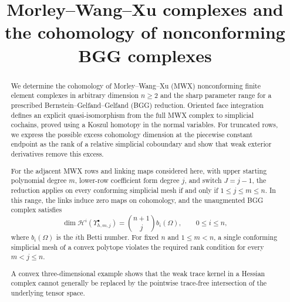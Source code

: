 \documentclass[10pt]{amsart}
\numberwithin{equation}{section}
\begin{document}
\title[MWX and nonconforming BGG cohomology]{Morley--Wang--Xu complexes and the cohomology of nonconforming BGG complexes}



\begin{abstract}
We determine the cohomology of Morley--Wang--Xu (MWX) nonconforming finite
element complexes in arbitrary dimension $n\geq2$ and the sharp parameter
range for a prescribed Bernstein--Gelfand--Gelfand (BGG) reduction.
Oriented face integration defines an explicit quasi-isomorphism from the
full MWX complex to simplicial cochains, proved using a
Koszul homotopy in the normal variables. For truncated rows, we express
the possible excess cohomology dimension at the piecewise constant endpoint
as the rank of a relative simplicial coboundary and show that weak exterior
derivatives remove this excess.

For the adjacent MWX rows and linking maps considered here, with upper
starting polynomial degree $m$, lower-row coefficient form degree $j$, and switch
$J=j-1$, the reduction applies on every conforming simplicial mesh if and
only if $1\leq j\leq m\leq n$. In this range, the links induce zero maps on
cohomology, and the unaugmented BGG complex satisfies
\[
\dim\mathscr H^i(\Upsilon_{h,m,j}^\bullet)
=\binom{n+1}{j}b_i(\Omega),\qquad 0\leq i\leq n,
\]
where $b_i(\Omega)$ is the $i$th Betti number.
For fixed $n$ and $1\leq m<n$, a single conforming simplicial mesh of a
convex polytope violates the required rank condition for every $m<j\leq n$.

A convex three-dimensional example shows that the weak trace kernel in
a Hessian complex cannot generally be replaced by the pointwise
trace-free intersection of the underlying tensor space.
\end{abstract} 
\end{document}
